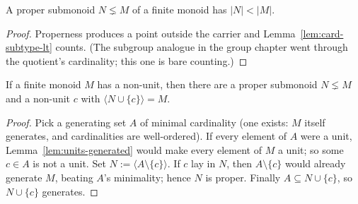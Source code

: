 \begin{lemma}\label{lem:submonoid-card}
  \leanok
  A proper submonoid $N \lneq M$ of a finite monoid has $|N| < |M|$.
\end{lemma}
\begin{proof}
  \leanok
  Properness produces a point outside the carrier and
  Lemma~\ref{lem:card-subtype-lt} counts. (The subgroup analogue in
  the group chapter went through the quotient's cardinality; this one
  is bare counting.)
\end{proof}

\begin{lemma}\label{lem:gen-split}
  \leanok
  If a finite monoid $M$ has a non-unit, then there are a proper
  submonoid $N \lneq M$ and a non-unit $c$ with
  $\langle N \cup \{c\} \rangle = M$.
\end{lemma}
\begin{proof}
  \leanok
  Pick a generating set $A$ of minimal cardinality (one exists: $M$
  itself generates, and cardinalities are well-ordered). If every
  element of $A$ were a unit, Lemma~\ref{lem:units-generated} would
  make every element of $M$ a unit; so some $c \in A$ is not a unit.
  Set $N := \langle A \setminus \{c\} \rangle$. If $c$ lay in $N$,
  then $A \setminus \{c\}$ would already generate $M$, beating $A$'s
  minimality; hence $N$ is proper. Finally
  $A \subseteq N \cup \{c\}$, so $N \cup \{c\}$ generates.
\end{proof}
